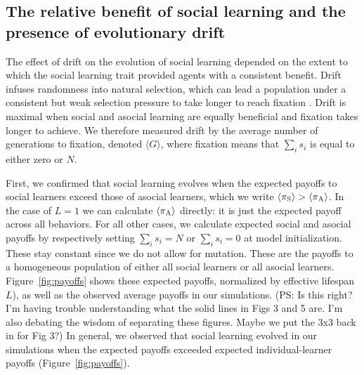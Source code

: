\documentclass[letterpaper,11.5pt]{scrartcl}
\newcommand{\ps}[1]{{\textcolor{mygreen} {({\tiny PS:} #1)}}}
\begin{document}
\subsection{The relative benefit of social learning and the presence of evolutionary drift}

The effect of drift on the evolution of social learning %
depended on the extent to which the social learning trait provided agents with a consistent benefit. Drift infuses randomness into natural selection, which can lead a population under a consistent but weak selection pressure to take longer to reach fixation \cite{plutynski2007drift}. Drift is maximal when social and asocial learning are equally beneficial and fixation takes longer to achieve. We therefore measured drift by the average number of generations to fixation, denoted $\langle G \rangle$, where fixation means that $\sum_i s_i$ is equal to either zero or $N$. %


First, we confirmed that social learning evolves when the expected payoffs to social
learners exceed those of asocial learners, which we write $\langle \pi_\mathrm{S} \rangle > \langle \pi_\mathrm{A} \rangle$.
In the case of $L=1$ we can calculate $\langle \pi_\mathrm{A} \rangle$ directly: it is just the expected
payoff across all behaviors. For all other cases, we calculate expected social and asocial payoffs by respectively setting
$\sum_i s_i = N$ or $\sum_i s_i = 0$ at model initialization. These stay constant since we do not allow for mutation. These are the payoffs to a homogeneous population of either all social learners or all asocial learners.  Figure~\ref{fig:payoffs} shows these expected payoffs, normalized by effective lifespan $L$), as well as the observed average payoffs in our simulations. \ps{Is this right? I'm having trouble understanding what the solid lines in Figs 3 and 5 are. I'm also debating the wisdom of separating these figures. Maybe we put the 3x3 back in for Fig 3?}
In general, we observed that social learning evolved in our simulations when the expected payoffs exceeded expected individual-learner
payoffs (Figure~\ref{fig:payoffs}). 
\end{document}
